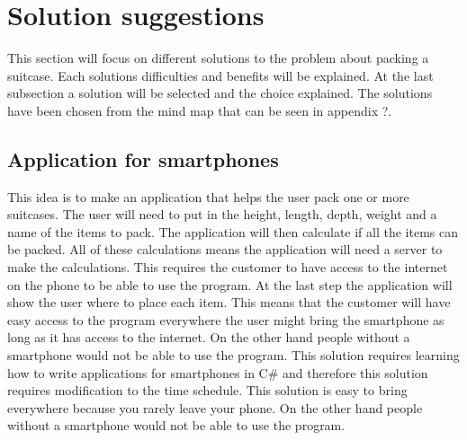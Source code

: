 \section{Solution suggestions} 	
This section will focus on different solutions to the problem about packing a suitcase. Each solutions difficulties and benefits will be explained. At the last subsection a solution will be selected and the choice explained. The solutions have been chosen from the mind map that can be seen in appendix ?.
\newline
\subsection{Application for smartphones}
This idea is to make an application that helps the user pack one or more suitcases. The user will need to put in the height, length, depth, weight and a name of the items to pack. The application will then calculate if all the items can be packed. All of these calculations means the application will need a server to make the calculations. This requires the customer to have access to the internet on the phone to be able to use the program. At the last step the application will show the user where to place each item. This means that the customer will have easy access to the program everywhere the user might bring the smartphone as long as it has access to the internet. On the other hand people without a smartphone would not be able to use the program. This solution requires learning how to write applications for smartphones in C# and therefore this solution requires modification to the time schedule. This solution is easy to bring everywhere because you rarely leave your phone. On the other hand people without a smartphone would not be able to use the program.
\newline
